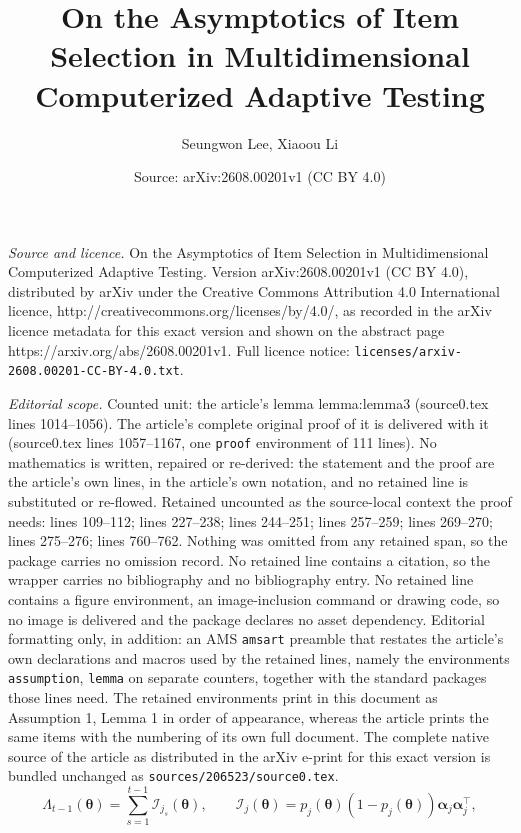 \documentclass[10pt,a4paper]{amsart}
\title{On the Asymptotics of Item Selection in Multidimensional Computerized Adaptive Testing}
\author{Seungwon Lee, Xiaoou Li}
\date{Source: arXiv:2608.00201v1 (CC BY 4.0)}
\newcommand{\bfalpha}{\boldsymbol{\alpha}}
\newcommand{\bftheta}{\boldsymbol{\theta}}
\begin{document}
\maketitle

\noindent\emph{Source and licence.} On the Asymptotics of Item Selection in Multidimensional Computerized Adaptive Testing. Version arXiv:2608.00201v1 (CC BY 4.0), distributed by arXiv under the Creative Commons Attribution 4.0 International licence, http://creativecommons.org/licenses/by/4.0/, as recorded in the arXiv licence metadata for this exact version and shown on the abstract page https://arxiv.org/abs/2608.00201v1. Full licence notice: \texttt{licenses/arxiv-2608.00201-CC-BY-4.0.txt}.\par\smallskip

\noindent\textit{Editorial scope.} Counted unit: the article's lemma lemma:lemma3 (source0.tex lines 1014--1056). The article's complete original proof of it is delivered with it (source0.tex lines 1057--1167, one \texttt{proof} environment of 111 lines). No mathematics is written, repaired or re-derived: the statement and the proof are the article's own lines, in the article's own notation, and no retained line is substituted or re-flowed.  Retained uncounted as the source-local context the proof needs: lines 109--112; lines 227--238; lines 244--251; lines 257--259; lines 269--270; lines 275--276; lines 760--762.  Nothing was omitted from any retained span, so the package carries no omission record.  No retained line contains a citation, so the wrapper carries no bibliography and no bibliography entry.  No retained line contains a figure environment, an image-inclusion command or drawing code, so no image is delivered and the package declares no asset dependency.  Editorial formatting only, in addition: an AMS \texttt{amsart} preamble that restates the article's own declarations and macros used by the retained lines, namely the environments \texttt{assumption}, \texttt{lemma} on separate counters, together with the standard packages those lines need.  The retained environments print in this document as Assumption 1, Lemma 1 in order of appearance, whereas the article prints the same items with the numbering of its own full document.  The complete native source of the article as distributed in the arXiv e-print for this exact version is bundled unchanged as \texttt{sources/206523/source0.tex}.
\begin{equation} \label{e:cumulative_fisher}
\Lambda_{t-1}( \bftheta )=\sum_{s=1}^{t-1} \mathcal{I}_{j_s}(\bftheta), 
\qquad \mathcal{I}_j(\bftheta)=p_j(\bftheta)(1-p_j(\bftheta))\bfalpha_j\bfalpha_j^\top,
\end{equation}
\end{document}
